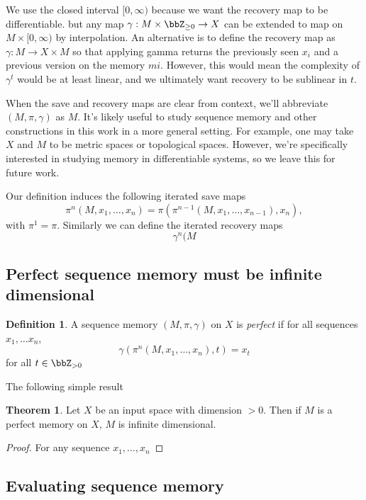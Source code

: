 \documentclass{article}
\theoremstyle{definition}
\newtheorem{definition}{Definition}[section]
\theoremstyle{theorem}
\newtheorem{theorem}{Theorem}[section]
\begin{document}
We use the closed interval $[0, \infty)$ because we want the recovery map to be differentiable. but any map $\gamma: M \times \bbZ_{\geq 0} \rightarrow X$ can be extended to map on $M \times [0, \infty)$ by interpolation. An alternative is to define the recovery map as $\gamma: M \rightarrow X \times M$ so that applying gamma returns the previously seen $x_i$ and a previous version on the memory $mi$. However, this would mean the complexity of $\gamma^t$ would be at least linear, and we ultimately want recovery to be sublinear in $t$.
\par
When the save and recovery maps are clear from context, we'll abbreviate $(M, \pi, \gamma)$ as $M$. It's likely useful to study sequence memory and other constructions in this work in a more general setting. For example, one may take $X$ and $M$ to be metric spaces or topological spaces. However, we're specifically interested in studying memory in differentiable systems, so we leave this for future work.
\par
Our definition induces the following iterated save maps
\[
\pi^n(M, x_1, \dots, x_n) = \pi(\pi^{n-1}(M, x_1, \dots, x_{n-1}), x_n),
\]
with $\pi^1 = \pi$. Similarly we can define the iterated recovery maps
\[
\gamma^n(M
\]

\subsection{Perfect sequence memory must be infinite dimensional}

\begin{definition}
A sequence memory $(M, \pi, \gamma)$ on $X$ is \textit{perfect} if for all sequences $x_1, \dots x_n$,
\[
\gamma(\pi^n(M, x_1, \dots, x_n), t) = x_t
\]
for all $t \in \bbZ_{>0}$
\end{definition}
 
The following simple result 
\begin{theorem}
Let $X$ be an input space with dimension $> 0$. Then if $M$ is a perfect memory on $X$, $M$ is infinite dimensional.
\end{theorem}

\begin{proof}
For any sequence $x_1, \dots, x_n$
\end{proof}

\subsection{Evaluating sequence memory}
\end{document}
